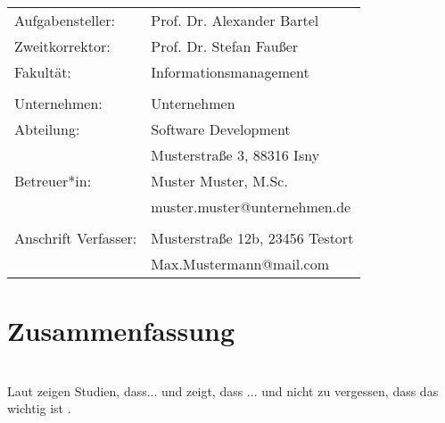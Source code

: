 \documentclass[12pt, a4paper, twoside]{article} %
\makeatletter
\newcommand*{\getFaculty}{Informationsmanagement}
\newcommand*{\getAuthorAddress}{Musterstraße 12b, 23456 Testort}
\newcommand*{\getAuthorEmail}{Max.Mustermann@mail.com}
\newcommand*{\getSupervisor}{Prof. Dr. Alexander Bartel}
\newcommand*{\getCoSupervisor}{Prof. Dr. Stefan Faußer}
\newcommand*{\getAdvisor}{Muster Muster, M.Sc.}
\newcommand*{\getCompany}{Unternehmen}
\newcommand*{\getCompanyDepartment}{Software Development}
\newcommand*{\getCompanyAddress}{Musterstraße 3, 88316 Isny}
\makeatother
\begin{document}
\begin{titlepage}
\begin{center}
\begin{minipage}{\textwidth}
            \begin{minipage}{0.4\textwidth}
                \raggedleft
                \small
                \begin{tabular}{l l}
                    Aufgabensteller: & \getSupervisor \\
                    Zweitkorrektor: & \getCoSupervisor \\
                    Fakultät: & \getFaculty \\
    			&\\
                    Unternehmen: & \getCompany \\
                    Abteilung: & \getCompanyDepartment \\
                    &\getCompanyAddress \\
                    Betreuer*in: & \getAdvisor \\
                    &muster.muster@unternehmen.de \\
        		&\\
                    Anschrift Verfasser: & \getAuthorAddress \\
                    &\getAuthorEmail \\
                \end{tabular}
            \end{minipage}
        \end{minipage}


        \vspace*{\fill} %
    \end{center}
\end{titlepage}

\restoregeometry %

\section*{Zusammenfassung}
\lipsum[1-2] %
\\
Laut \cite{example} zeigen Studien, dass... und \cite{lin1973} zeigt, dass ... und nicht zu vergessen, dass das wichtig ist \cite[vgl.][S. 15ff.]{Jain}.
\end{document}
